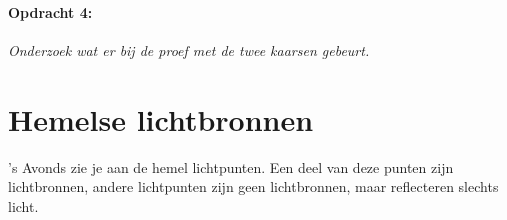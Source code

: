 \paragraph*{Opdracht 4:}

\emph{Onderzoek wat er bij de proef met de twee kaarsen gebeurt.}


\section{Hemelse lichtbronnen}

's Avonds zie je aan de hemel lichtpunten. Een deel van deze punten
zijn lichtbronnen, andere lichtpunten zijn geen lichtbronnen, maar
reflecteren slechts licht.


